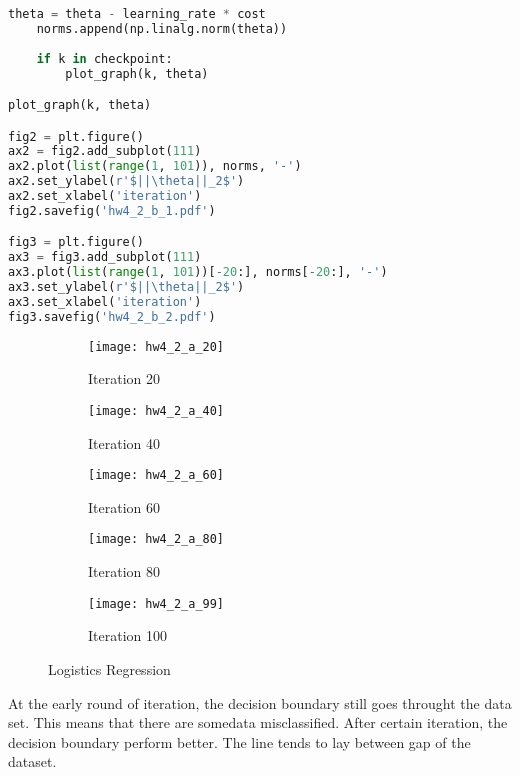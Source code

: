 \documentclass[11pt]{article}
\begin{document}
\begin{enumerate}[label=(\alph*)]
\begin{lstlisting}[language=Python, showstringspaces=false]
    theta = theta - learning_rate * cost
    norms.append(np.linalg.norm(theta))
    
    if k in checkpoint:
        plot_graph(k, theta)

plot_graph(k, theta)

fig2 = plt.figure()
ax2 = fig2.add_subplot(111)
ax2.plot(list(range(1, 101)), norms, '-')
ax2.set_ylabel(r'$||\theta||_2$')
ax2.set_xlabel('iteration')
fig2.savefig('hw4_2_b_1.pdf')

fig3 = plt.figure()
ax3 = fig3.add_subplot(111)
ax3.plot(list(range(1, 101))[-20:], norms[-20:], '-')
ax3.set_ylabel(r'$||\theta||_2$')
ax3.set_xlabel('iteration')
fig3.savefig('hw4_2_b_2.pdf')

\end{lstlisting}

\begin{figure}[H]
\begin{subfigure}{.5\textwidth}
  \centering
  \texttt{[image: hw4\_2\_a\_20]}
  \caption{Iteration 20}
  \label{fig:hw4_2_a_20}
\end{subfigure}
\begin{subfigure}{.5\textwidth}
  \centering
  \texttt{[image: hw4\_2\_a\_40]}
  \caption{Iteration 40}
  \label{fig:hw4_2_a_40}
\end{subfigure}

\begin{subfigure}{.5\textwidth}
  \centering
  \texttt{[image: hw4\_2\_a\_60]}
  \caption{Iteration 60}
  \label{fig:hw4_2_a_60}
\end{subfigure}
\begin{subfigure}{.5\textwidth}
  \centering
  \texttt{[image: hw4\_2\_a\_80]}
  \caption{Iteration 80}
  \label{fig:hw4_2_a_80}
\end{subfigure}
\begin{subfigure}{.5\textwidth}
  \centering
  \texttt{[image: hw4\_2\_a\_99]}
  \caption{Iteration 100}
  \label{fig:hw4_2_a_99}
\end{subfigure}

\caption{Logistics Regression}
\label{fig:hw4_2_a}
\end{figure}

At the early round of iteration, the decision boundary still goes throught the data set. This means that there are somedata misclassified.
After certain iteration, the decision boundary perform better. The line tends to lay between gap of the dataset. 


\end{enumerate}
\end{document}
